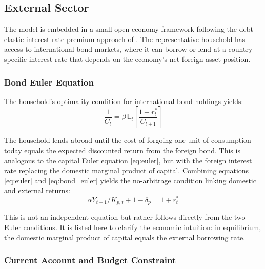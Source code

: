 \documentclass[12pt, a4paper]{article}
\begin{document}
\subsection{External Sector}

The model is embedded in a small open economy framework following the debt-elastic interest rate premium approach of \citet{schmittgrohe2003}. The representative household has access to international bond markets, where it can borrow or lend at a country-specific interest rate that depends on the economy's net foreign asset position.

\subsubsection{Bond Euler Equation}

The household's optimality condition for international bond holdings yields:
\begin{equation}
\frac{1}{C_t} = \beta \, \mathbb{E}_t \left[ \frac{1 + r^*_t}{C_{t+1}} \right]
\label{eq:bond_euler}
\end{equation}

The household lends abroad until the cost of forgoing one unit of consumption today equals the expected discounted return from the foreign bond. This is analogous to the capital Euler equation \eqref{eq:euler}, but with the foreign interest rate replacing the domestic marginal product of capital. Combining equations \eqref{eq:euler} and \eqref{eq:bond_euler} yields the no-arbitrage condition linking domestic and external returns:
\begin{equation}
\alpha Y_{t+1}/K_{p,t} + 1 - \delta_p = 1 + r^*_t
\label{eq:no_arbitrage}
\end{equation}

\noindent This is not an independent equation but rather follows directly from the two Euler conditions. It is listed here to clarify the economic intuition: in equilibrium, the domestic marginal product of capital equals the external borrowing rate.

\subsubsection{Current Account and Budget Constraint}
\end{document}
